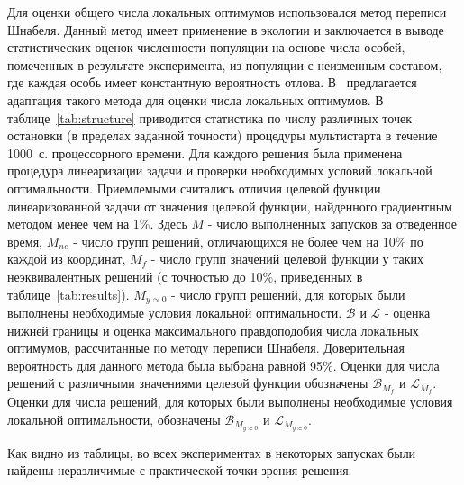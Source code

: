 Для оценки общего числа локальных оптимумов использовался метод переписи Шнабеля. Данный метод имеет применение в экологии и заключается в
выводе статистических оценок численности популяции на основе числа особей, помеченных в результате эксперимента, из популяции с неизменным
составом, где каждая особь имеет константную вероятность отлова. В~\cite{eremeev:confidence} предлагается адаптация такого метода для оценки числа локальных оптимумов. В таблице~\ref{tab:structure} приводится статистика по числу различных точек остановки (в пределах заданной точности) процедуры мультистарта в течение 1000~с. процессорного времени. Для каждого решения была применена процедура линеаризации задачи и проверки необходимых условий локальной оптимальности. Приемлемыми считались отличия целевой функции линеаризованной задачи от значения целевой функции, найденного градиентным методом менее чем на 1\%. Здесь {$M$} - число выполненных запусков за отведенное время, $M_{ne}$ - число групп решений, отличающихся не более чем на 10\% по каждой из координат, {$M_{f}$} - число групп значений целевой функции у таких неэквивалентных решений (с точностью до 10\%, приведенных в таблице~\ref{tab:results}). {$M_{y\approx0}$} - число групп решений, для которых были выполнены необходимые условия локальной оптимальности. $\mathcal{B}$ и $\mathcal{L}$ - оценка нижней границы и оценка максимального правдоподобия числа локальных оптимумов, рассчитанные по методу переписи Шнабеля. Доверительная вероятность для данного метода была выбрана равной 95\%. Оценки для числа решений с различными значениями целевой функции обозначены $\mathcal{B}_{M_f}$ и $\mathcal{L}_{M_f}$. Оценки для числа решений, для которых были выполнены необходимые условия локальной оптимальности, обозначены $\mathcal{B}_{M_{y\approx0}}$ и $\mathcal{L}_{M_{y\approx0}}$.

Как видно из таблицы, во всех экспериментах в некоторых запусках были найдены неразличимые с практической точки зрения решения.

